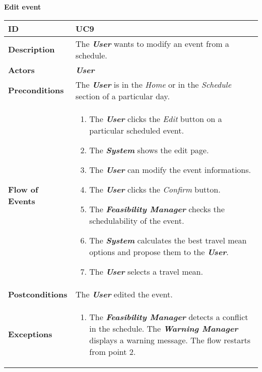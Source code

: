 \begin{center}
	\textbf{Edit event}
\end{center}

\begin{tabularx}{\linewidth}{| l | X |}
	\hline
	\textbf{ID} & UC9\\
	
	\hline
	\textbf{Description} & The \textbf{\textit{User}} wants to modify an event from a schedule.\\
	
	\hline
	\textbf{Actors} & \textbf{\textit{User}}\\
	
	\hline
	\textbf{Preconditions} & The \textbf{\textit{User}} is in the \textit{Home} or in the \textit{Schedule} section of a particular day.\\
	
	\hline
	\textbf{Flow of Events} & \parbox{0.7\textwidth}{\begin{enumerate}
			\item The \textbf{\textit{User}} clicks the \textit{Edit} button on a particular scheduled event.
			\item The \textit{\textbf{System}} shows the edit page.
			\item The \textit{\textbf{User}} can modify the event informations.
			\item The \textit{\textbf{User}} clicks the \textit{Confirm} button.
			\item The \textbf{\textit{Feasibility Manager}} checks the schedulability of the event.
			\item The \textbf{\textit{System}} calculates the best travel mean options and propose them to the \textbf{\textit{User}}.
			\item The \textbf{\textit{User}} selects a travel mean.
	\end{enumerate}}\\
	
	\hline
	\textbf{Postconditions} & The \textbf{\textit{User}} edited the event. \\
	
	\hline
	\textbf{Exceptions} & \parbox{0.7\textwidth}{ \begin{enumerate}
			\item The \textbf{\textit{Feasibility Manager}} detects a conflict in the schedule. The \textbf{\textit{Warning Manager}} displays a warning message. The flow restarts from point 2.
	\end{enumerate}}\\
	
	\hline
	
\end{tabularx}


